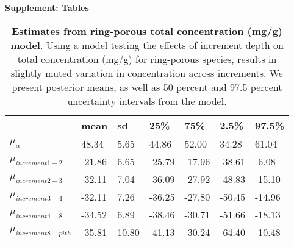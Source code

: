 \documentclass{article}\usepackage[]{graphicx}\usepackage[]{color}
\begin{document}
\noindent 
\textbf{\LARGE{Supplement: Tables}} 

\renewcommand{\thetable}{S\arabic{table}}
\renewcommand{\thefigure}{S\arabic{figure}}

\begin{table}[ht]
\centering
\caption{\textbf{Estimates from ring-porous total concentration (mg/g) model}. Using a model testing the effects of increment depth on total concentration (mg/g) for ring-porous species, results in slightly muted variation in concentration across increments. We present posterior means, as well as 50 percent and 97.5 percent uncertainty intervals from the model.} 
\label{tab:lat}
\begingroup\footnotesize
\begin{tabular}{|p{}|p{}|p{}|p{}|p{}|p{}|p{}|}
  \hline
 & mean & sd & 25\% & 75\% & 2.5\% & 97.5\% \\ 
  \hline
$\mu_{\alpha}$ & 48.34 & 5.65 & 44.86 & 52.00 & 34.28 & 61.04 \\ 
  $\mu_{increment 1-2}$ & -21.86 & 6.65 & -25.79 & -17.96 & -38.61 & -6.08 \\ 
  $\mu_{increment 2-3}$ & -32.11 & 7.04 & -36.09 & -27.92 & -48.83 & -15.10 \\ 
  $\mu_{increment 3-4}$ & -32.11 & 7.26 & -36.25 & -27.80 & -50.45 & -14.96 \\ 
  $\mu_{increment 4-8}$ & -34.52 & 6.89 & -38.46 & -30.71 & -51.66 & -18.13 \\ 
  $\mu_{increment 8-pith}$ & -35.81 & 10.80 & -41.13 & -30.24 & -64.40 & -10.48 \\ 
   \hline
\end{tabular}
\endgroup
\end{table}
\end{document}
